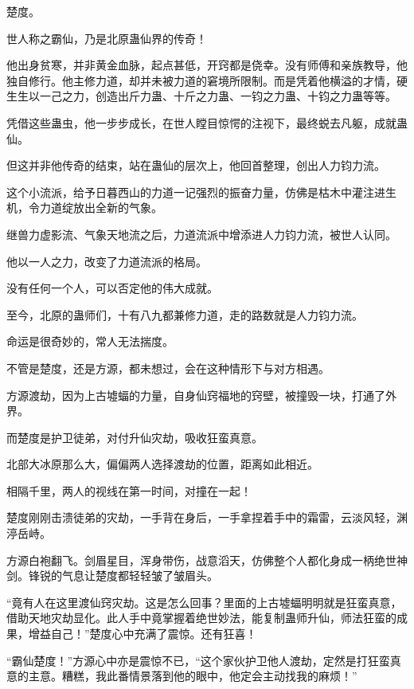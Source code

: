 
\begin{this_body}



楚度。

世人称之霸仙，乃是北原蛊仙界的传奇！

他出身贫寒，并非黄金血脉，起点甚低，开窍都是侥幸。没有师傅和亲族教导，他独自修行。他主修力道，却并未被力道的窘境所限制。而是凭着他横溢的才情，硬生生以一己之力，创造出斤力蛊、十斤之力蛊、一钧之力蛊、十钧之力蛊等等。

凭借这些蛊虫，他一步步成长，在世人瞠目惊愕的注视下，最终蜕去凡躯，成就蛊仙。

但这并非他传奇的结束，站在蛊仙的层次上，他回首整理，创出人力钧力流。

这个小流派，给予日暮西山的力道一记强烈的振奋力量，仿佛是枯木中灌注进生机，令力道绽放出全新的气象。

继兽力虚影流、气象天地流之后，力道流派中增添进人力钧力流，被世人认同。

他以一人之力，改变了力道流派的格局。

没有任何一个人，可以否定他的伟大成就。

至今，北原的蛊师们，十有八九都兼修力道，走的路数就是人力钧力流。

命运是很奇妙的，常人无法揣度。

不管是楚度，还是方源，都未想过，会在这种情形下与对方相遇。

方源渡劫，因为上古墟蝠的力量，自身仙窍福地的窍壁，被撞毁一块，打通了外界。

而楚度是护卫徒弟，对付升仙灾劫，吸收狂蛮真意。

北部大冰原那么大，偏偏两人选择渡劫的位置，距离如此相近。

相隔千里，两人的视线在第一时间，对撞在一起！

楚度刚刚击溃徒弟的灾劫，一手背在身后，一手拿捏着手中的霜雷，云淡风轻，渊渟岳峙。

方源白袍翻飞。剑眉星目，浑身带伤，战意滔天，仿佛整个人都化身成一柄绝世神剑。锋锐的气息让楚度都轻轻皱了皱眉头。

“竟有人在这里渡仙窍灾劫。这是怎么回事？里面的上古墟蝠明明就是狂蛮真意，借助天地灾劫显化。此人手中竟掌握着绝世妙法，能复制蛊师升仙，师法狂蛮的成果，增益自己！”楚度心中充满了震惊。还有狂喜！

“霸仙楚度！”方源心中亦是震惊不已，“这个家伙护卫他人渡劫，定然是打狂蛮真意的主意。糟糕，我此番情景落到他的眼中，他定会主动找我的麻烦！”


\end{this_body}
